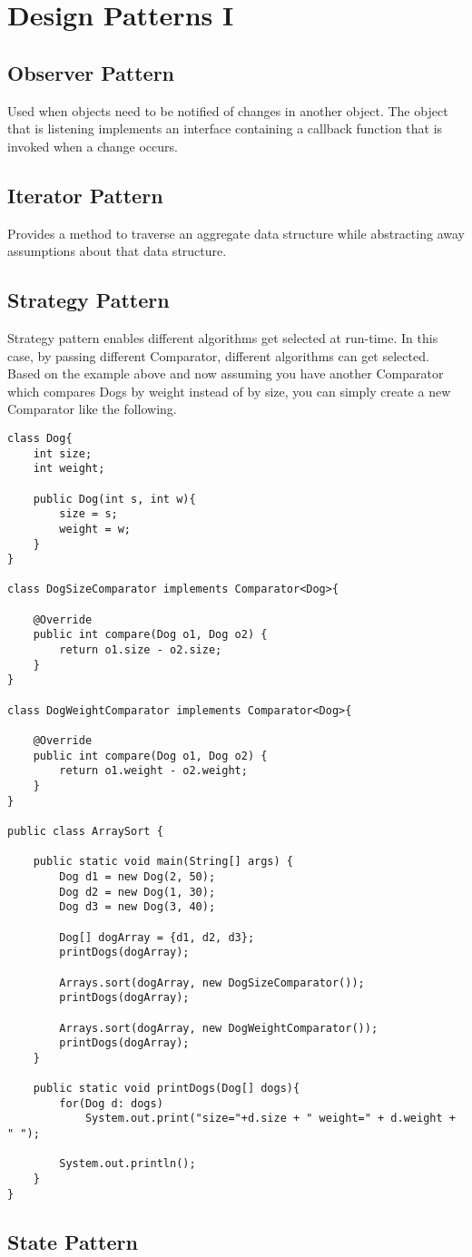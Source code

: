 
\chapter{Design Patterns I}


\section{Observer Pattern}

Used when objects need to be notified of changes in
another object. The object that is listening implements an
interface containing a callback function that is invoked when
a change occurs.

\section{Iterator Pattern}

Provides a method to traverse an aggregate data
structure while abstracting away assumptions about that
data structure.


\section{Strategy Pattern}

Strategy pattern enables different algorithms get selected at run-time. 
In this case, by passing different Comparator, different algorithms can get selected. 
Based on the example above and now assuming you have another 
Comparator which compares Dogs by weight instead of by size, 
you can simply create a new Comparator like the following.

\begin{lstlisting}
class Dog{
	int size;
	int weight;
 
	public Dog(int s, int w){
		size = s;
		weight = w; 
	}
}
 
class DogSizeComparator implements Comparator<Dog>{
 
	@Override
	public int compare(Dog o1, Dog o2) {
		return o1.size - o2.size;
	}
}
 
class DogWeightComparator implements Comparator<Dog>{
 
	@Override
	public int compare(Dog o1, Dog o2) {
		return o1.weight - o2.weight;
	}
}
 
public class ArraySort {
 
	public static void main(String[] args) {
		Dog d1 = new Dog(2, 50);
		Dog d2 = new Dog(1, 30);
		Dog d3 = new Dog(3, 40);
 
		Dog[] dogArray = {d1, d2, d3};
		printDogs(dogArray);
 
		Arrays.sort(dogArray, new DogSizeComparator());	
		printDogs(dogArray);
 
		Arrays.sort(dogArray, new DogWeightComparator());	
		printDogs(dogArray);
	}
 
	public static void printDogs(Dog[] dogs){
		for(Dog d: dogs)
			System.out.print("size="+d.size + " weight=" + d.weight + " ");
 
		System.out.println();
	}
}
\end{lstlisting}



\section{State Pattern}


